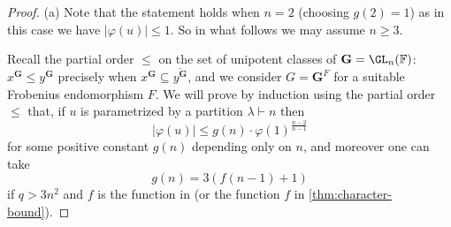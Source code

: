 \documentclass[eqthmnum,nocolour,skinny]{jt-calcs}
\newcommand{\GC}{\mathbf {G}}
\newcommand{\lam}{\lambda}
\newcommand{\KK}{\mathbb {F}}
\begin{document}
\begin{proof}
(a) Note that the statement holds when $n=2$ (choosing $g(2) = 1$) as in this case we have $|\varphi(u)| \leq 1$. So in what follows
we may assume $n \geq 3$.

Recall the partial order $\leq$ on the set of unipotent classes of $\GC = \GL_n(\KK)$:
$x^\GC \leq y^\GC$ precisely when $x^\GC \subseteq \overline{y^\GC}$, and we consider
$G = \GC^F$ for a suitable Frobenius endomorphism $F$.
We will prove by induction using
the partial order $\leq$ that, if $u$ is parametrized by a partition $\lam \vdash n$ then
\begin{equation*}
|\varphi(u)| \leq g(n) \cdot \varphi(1)^{\frac{n-2}{n-1}}
\end{equation*}
for some positive constant $g(n)$ depending only on $n$, and moreover one can take
\begin{equation}\label{for-g}
g(n) = 3(f(n-1)+1)
\end{equation}
if $q > 3n^2$ and $f$ is the function in \cite[Thm.~1.1]{bezrukavnikov-liebeck-shalev-tiep:2017:character-bounds-grps-Lie-type} (or the function
$f$ in \cref{thm:character-bound}).


\end{proof}
\end{document}
